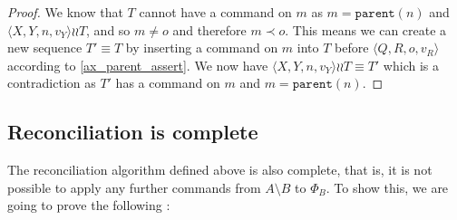 \documentclass[12pt]{article}
\newcommand{\parent}{\mathtt{parent}}
\newcommand{\FS}{\Phi} %
\newcommand{\valvy}{v_Y} %
\newcommand{\valvr}{v_R}
\newcommand{\caaaa}[4]{\langle{#1,#2,#3,#4}\rangle}
\newcommand{\cxynv}{\caaaa{X}{Y}{n}{\valvy}}
\newcommand{\cqrov}{\caaaa{Q}{R}{o}{\valvr}}
\newcommand{\descendant}{\prec}
\newcommand{\indep}{\mathrel{\wr\wr}} %
\theoremstyle{definition}
\begin{document}
\begin{proof}
We know that $T$ cannot have a command on $m$ as $m=\parent(n)$ and $\cxynv\indep T$,
and so $m\neq o$ and therefore $m\descendant o$.
This means we can create a new sequence $T'\equiv T$ by inserting a command on 
$m$ into $T$ before $\cqrov$
according to \cref{ax_parent_assert}.
We now have $\cxynv\indep T\equiv T'$ which is a contradiction as
$T'$ has a command on $m$ and $m=\parent(n)$.
\end{proof}


\subsection{Reconciliation is complete}


The reconciliation algorithm defined above is also complete, that is,
it is not possible to apply any further commands from $A\setminus B$ to $\FS_B$.
To show this, we are going to prove the following :
\end{document}

